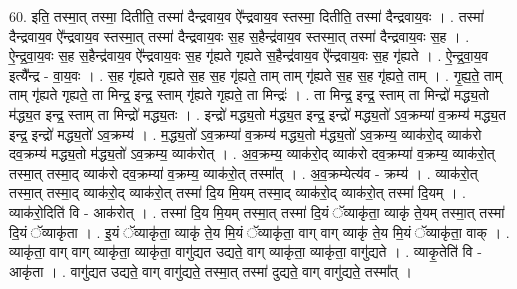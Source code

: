 \documentclass[17pt]{extarticle}
\begin{document}
60. इति॒ तस्मा॒त् तस्मा॒ दितीति॒ तस्मा॑ दैन्द्रवाय॒व ऐ᳚न्द्रवाय॒व स्तस्मा॒ दितीति॒ तस्मा॑ दैन्द्रवाय॒वः । . तस्मा॑ दैन्द्रवाय॒व ऐ᳚न्द्रवाय॒व स्तस्मा॒त् तस्मा॑ दैन्द्रवाय॒वः स॒ह स॒हैन्द्र॑वाय॒व स्तस्मा॒त् तस्मा॑ दैन्द्रवाय॒वः स॒ह । . ऐ॒न्द्र॒वा॒य॒वः स॒ह स॒हैन्द्र॑वाय॒व ऐ᳚न्द्रवाय॒वः स॒ह गृ॑ह्यते गृह्यते स॒हैन्द्र॑वाय॒व ऐ᳚न्द्रवाय॒वः स॒ह गृ॑ह्यते । . ऐ॒न्द्र॒वा॒य॒व इत्यै᳚न्द्र - वा॒य॒वः । . स॒ह गृ॑ह्यते गृह्यते स॒ह स॒ह गृ॑ह्यते॒ ताम् ताम् गृ॑ह्यते स॒ह स॒ह गृ॑ह्यते॒ ताम् । . गृ॒ह्य॒ते॒ ताम् ताम् गृ॑ह्यते गृह्यते॒ ता मिन्द्र॒ इन्द्र॒ स्ताम् गृ॑ह्यते गृह्यते॒ ता मिन्द्रः॑ । . ता मिन्द्र॒ इन्द्र॒ स्ताम् ता मिन्द्रो॑ मद्ध्य॒तो म॑द्ध्य॒त इन्द्र॒ स्ताम् ता मिन्द्रो॑ मद्ध्य॒तः । . इन्द्रो॑ मद्ध्य॒तो म॑द्ध्य॒त इन्द्र॒ इन्द्रो॑ मद्ध्य॒तो॑ ऽव॒क्रम्या॑ व॒क्रम्य॑ मद्ध्य॒त इन्द्र॒ इन्द्रो॑ मद्ध्य॒तो॑ ऽव॒क्रम्य॑ । . म॒द्ध्य॒तो॑ ऽव॒क्रम्या॑ व॒क्रम्य॑ मद्ध्य॒तो म॑द्ध्य॒तो॑ ऽव॒क्रम्य॒ व्याक॑रो॒द् व्याक॑रो दव॒क्रम्य॑ मद्ध्य॒तो म॑द्ध्य॒तो॑ ऽव॒क्रम्य॒ व्याक॑रोत् । . अ॒व॒क्रम्य॒ व्याक॑रो॒द् व्याक॑रो दव॒क्रम्या॑ व॒क्रम्य॒ व्याक॑रो॒त् तस्मा॒त् तस्मा॒द् व्याक॑रो दव॒क्रम्या॑ व॒क्रम्य॒ व्याक॑रो॒त् तस्मा᳚त् । . अ॒व॒क्रम्येत्य॑व - क्रम्य॑ । . व्याक॑रो॒त् तस्मा॒त् तस्मा॒द् व्याक॑रो॒द् व्याक॑रो॒त् तस्मा॑ दि॒य मि॒यम् तस्मा॒द् व्याक॑रो॒द् व्याक॑रो॒त् तस्मा॑ दि॒यम् । . व्याक॑रो॒दिति॑ वि - आक॑रोत् । . तस्मा॑ दि॒य मि॒यम् तस्मा॒त् तस्मा॑ दि॒यं ॅव्याकृ॑ता॒ व्याकृ॑ ते॒यम् तस्मा॒त् तस्मा॑ दि॒यं ॅव्याकृ॑ता । . इ॒यं ॅव्याकृ॑ता॒ व्याकृ॑ ते॒य मि॒यं ॅव्याकृ॑ता॒ वाग् वाग् व्याकृ॑ ते॒य मि॒यं ॅव्याकृ॑ता॒ वाक् । . व्याकृ॑ता॒ वाग् वाग् व्याकृ॑ता॒ व्याकृ॑ता॒ वागु॑द्यत उद्यते॒ वाग् व्याकृ॑ता॒ व्याकृ॑ता॒ वागु॑द्यते । . व्याकृ॒तेति॑ वि - आकृ॑ता । . वागु॑द्यत उद्यते॒ वाग् वागु॑द्यते॒ तस्मा॒त् तस्मा॑ दुद्यते॒ वाग् वागु॑द्यते॒ तस्मा᳚त् । \newline
\end{document}
